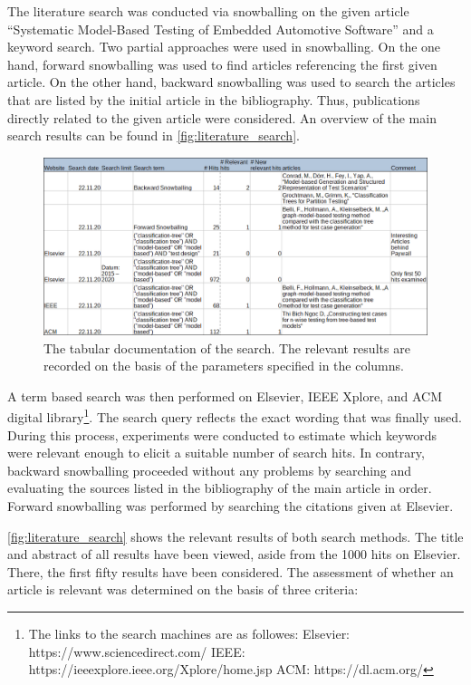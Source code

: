 The literature search was conducted via snowballing on the given article \enquote{Systematic Model-Based Testing of Embedded Automotive Software} and a keyword search. Two partial approaches were used in snowballing. On the one hand, forward snowballing was used to find articles referencing the first given article. On the other hand, backward snowballing was used to search the articles that are listed by the initial article in the bibliography. Thus, publications directly related to the given article were considered. An overview of the main search results can be found in \autoref{fig:literature_search}. 

\begin{figure}[H]
\centering
\includegraphics[scale=0.32]{../images/Suchdokumentation_v2.png} 
\caption{The tabular documentation of the search. The relevant results are recorded on the basis of the parameters specified in the columns.}
\label{fig:literature_search}
\end{figure}

A term based search was then performed on Elsevier, IEEE Xplore, and ACM digital library\footnote{The links to the search machines are as followes: Elsevier: https://www.sciencedirect.com/ IEEE: https://ieeexplore.ieee.org/Xplore/home.jsp ACM: https://dl.acm.org/ }. The search query reflects the exact wording that was finally used. During this process, experiments were conducted to estimate which keywords were relevant enough to elicit a suitable number of search hits. In contrary, backward snowballing proceeded without any problems by searching and evaluating the sources listed in the bibliography of the main article in order. Forward snowballing was performed by searching the citations given at Elsevier.

\autoref{fig:literature_search} shows the relevant results of both search methods. The title and abstract of all results have been viewed, aside from the 1000 hits on Elsevier. There, the first fifty results have been considered. The assessment of whether an article is relevant was determined on the basis of three criteria:

